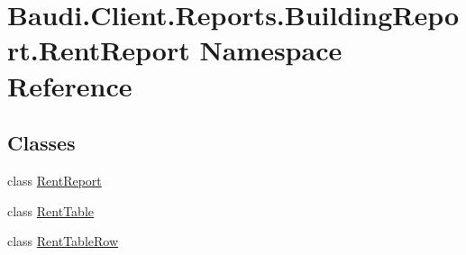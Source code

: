 \hypertarget{namespace_baudi_1_1_client_1_1_reports_1_1_building_report_1_1_rent_report}{}\section{Baudi.\+Client.\+Reports.\+Building\+Report.\+Rent\+Report Namespace Reference}
\label{namespace_baudi_1_1_client_1_1_reports_1_1_building_report_1_1_rent_report}
\subsection*{Classes}
\begin{DoxyCompactItemize}
\item 
class \hyperlink{class_baudi_1_1_client_1_1_reports_1_1_building_report_1_1_rent_report_1_1_rent_report}{Rent\+Report}
\item 
class \hyperlink{class_baudi_1_1_client_1_1_reports_1_1_building_report_1_1_rent_report_1_1_rent_table}{Rent\+Table}
\item 
class \hyperlink{class_baudi_1_1_client_1_1_reports_1_1_building_report_1_1_rent_report_1_1_rent_table_row}{Rent\+Table\+Row}
\end{DoxyCompactItemize}
